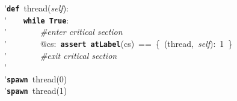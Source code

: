 \'\>\texttt{\textbf{def}}~thread(\textit{self}):\\

\'\>~~~~\texttt{\textbf{while}}~\texttt{\textbf{True}}:\\

\'\>~~~~~~~~\emph{\#enter critical section}\\

\'\>~~~~~~~~@cs:~\texttt{\textbf{assert}}~\texttt{\textbf{atLabel}}(cs)~==~\{~(thread,~\textit{self}):~1~\}\\

\'\>~~~~~~~~\emph{\#exit critical section}\\

\'\>~~~~\\

\'\>\texttt{\textbf{spawn}}~thread(0)\\

\'\>\texttt{\textbf{spawn}}~thread(1)